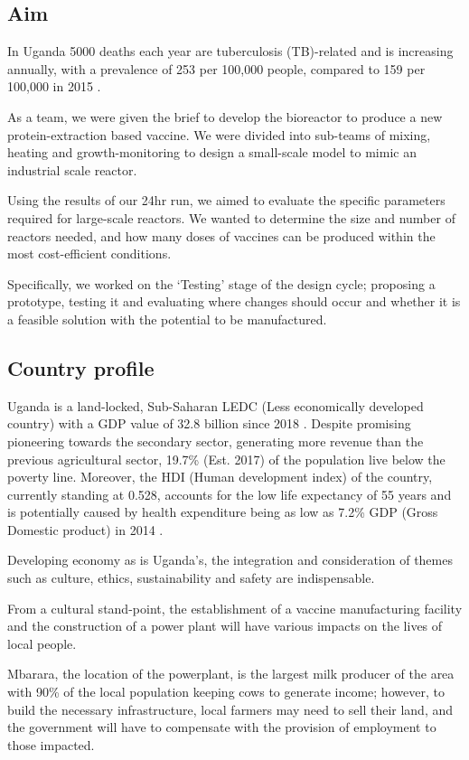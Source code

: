 \subsection{Aim}
In Uganda 5000 deaths each year are tuberculosis (TB)-related and is increasing annually, with a prevalence of 253 per 100,000 people, compared to 159 per 100,000 in 2015 \cite{Olle-GoigJaimeE.2004DfMi}.

As a team, we were given the brief to develop the bioreactor to produce a new protein-extraction based vaccine. We were divided into sub-teams of mixing, heating and growth-monitoring to design a small-scale model to mimic an industrial scale reactor.  

Using the results of our 24hr run, we aimed to evaluate the specific parameters required for large-scale reactors. We wanted to determine the size and number of reactors needed, and how many doses of vaccines can be produced within the most cost-efficient conditions.  

Specifically, we worked on the ‘Testing’ stage of the design cycle; proposing a prototype, testing it and evaluating where changes should occur and whether it is a feasible solution with the potential to be manufactured.

\subsection{Country profile}
Uganda is a land-locked, Sub-Saharan LEDC (Less economically developed country) with a GDP value of 32.8 billion since 2018 \cite{WB:2019Uganda}. Despite promising pioneering towards the secondary sector, generating more revenue than the previous agricultural sector, 19.7\% (Est. 2017) of the population live below the poverty line. Moreover, the HDI (Human development index) of the country, currently standing at 0.528, accounts for the low life expectancy of 55 years and is potentially caused by health expenditure being as low as 7.2\% GDP (Gross Domestic product) in 2014 \cite{BigstenArne2001IUae}.

 Developing economy as is Uganda’s, the integration and consideration of themes such as culture, ethics, sustainability and safety are indispensable.  

From a cultural stand-point, the establishment of a vaccine manufacturing facility and the construction of a power plant will have various impacts on the lives of local people.  

Mbarara, the location of the powerplant, is the largest milk producer of the area with 90\% of the local population keeping cows to generate income; however, to build the necessary infrastructure, local farmers may need to sell their land, and the government will have to compensate with the provision of employment to those impacted. 

